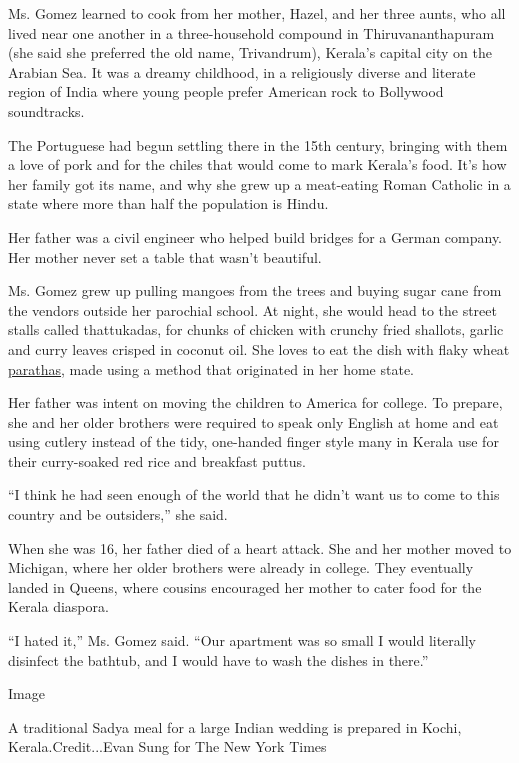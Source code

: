 Ms. Gomez learned to cook from her mother, Hazel, and her three aunts,
who all lived near one another in a three-household compound in
Thiruvananthapuram (she said she preferred the old name, Trivandrum),
Kerala's capital city on the Arabian Sea. It was a dreamy childhood, in
a religiously diverse and literate region of India where young people
prefer American rock to Bollywood soundtracks.

The Portuguese had begun settling there in the 15th century, bringing
with them a love of pork and for the chiles that would come to mark
Kerala's food. It's how her family got its name, and why she grew up a
meat-eating Roman Catholic in a state where more than half the
population is Hindu.

Her father was a civil engineer who helped build bridges for a German
company. Her mother never set a table that wasn't beautiful.

Ms. Gomez grew up pulling mangoes from the trees and buying sugar cane
from the vendors outside her parochial school. At night, she would head
to the street stalls called thattukadas, for chunks of chicken with
crunchy fried shallots, garlic and curry leaves crisped in coconut oil.
She loves to eat the dish with flaky wheat
\href{http://food.ndtv.com/opinions/taste-of-kerala-what-it-takes-to-perfect-a-malabar-parotta-744958}{parathas},
made using a method that originated in her home state.

Her father was intent on moving the children to America for college. To
prepare, she and her older brothers were required to speak only English
at home and eat using cutlery instead of the tidy, one-handed finger
style many in Kerala use for their curry-soaked red rice and breakfast
puttus.

``I think he had seen enough of the world that he didn't want us to come
to this country and be outsiders,'' she said.

When she was 16, her father died of a heart attack. She and her mother
moved to Michigan, where her older brothers were already in college.
They eventually landed in Queens, where cousins encouraged her mother to
cater food for the Kerala diaspora.

``I hated it,'' Ms. Gomez said. ``Our apartment was so small I would
literally disinfect the bathtub, and I would have to wash the dishes in
there.''

Image

A traditional Sadya meal for a large Indian wedding is prepared in
Kochi, Kerala.Credit...Evan Sung for The New York Times

